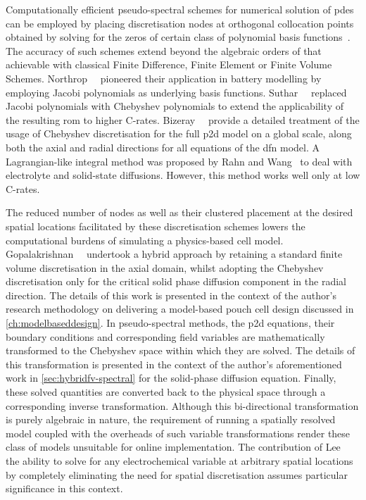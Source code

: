 Computationally    efficient     pseudo-spectral    schemes     for    numerical
solution   of   \glspl{pde}   can   be  employed   by   placing   discretisation
nodes    at    orthogonal    collocation     points    obtained    by    solving
for     the     zeros    of     certain     class     of    polynomial     basis
functions~\cite{Ferguson1971,Trefethen2000,Boyd2001,Shizgal2015,Dutykh2016}. The
accuracy of such  schemes extend beyond the algebraic orders  of that achievable
with  classical Finite  Difference,  Finite Element  or  Finite Volume  Schemes.
Northrop~\etal{}~\cite{Northrop2011}  pioneered  their  application  in  battery
modelling  by  employing  Jacobi  polynomials  as  underlying  basis  functions.
Suthar~\etal{}~\cite{Suthar2014}  replaced  Jacobi  polynomials  with  Chebyshev
polynomials to  extend the  applicability of the  resulting \gls{rom}  to higher
C-rates. Bizeray~\etal{}~\cite{Bizeray2015} provide a  detailed treatment of the
usage  of Chebyshev  discretisation for  the full  \gls{p2d} model  on a  global
scale, \ie{} along both the axial and radial directions for all equations of the
\gls{dfn}  model. A  Lagrangian-like integral  method was  proposed by  Rahn and
Wang~\cite{Rahn2013}  to  deal  with  electrolyte  and  solid-state  diffusions.
However, this method works well only at low C-rates.


The  reduced  number   of  nodes  as  well  as  their   clustered  placement  at
the  desired  spatial  locations  facilitated by  these  discretisation  schemes
lowers  the computational  burdens  of simulating  a  physics-based cell  model.
Gopalakrishnan~\etal{}~\cite{Gopalakrishnan2018} undertook a  hybrid approach by
retaining a  standard finite volume  discretisation in the axial  domain, whilst
adopting  the  Chebyshev  discretisation  only  for  the  critical  solid  phase
diffusion  component in  the  radial  direction. The  details  of  this work  is
presented in  the context of the  author's research methodology on  delivering a
model-based  pouch  cell  design  discussed  in  \cref{ch:modelbaseddesign}.  In
pseudo-spectral  methods, the  \gls{p2d}  equations,  their boundary  conditions
and  corresponding  field  variables   are  mathematically  transformed  to  the
Chebyshev   space  within   which  they   are  solved.   The  details   of  this
transformation  is  presented in  the  context  of the  author's  aforementioned
work  in \cref{sec:hybridfv-spectral}  for the  solid-phase diffusion  equation.
Finally,  these solved  quantities  are  converted back  to  the physical  space
through  a corresponding  inverse transformation.  Although this  bi-directional
transformation  is  purely  algebraic  in nature,  the  requirement  of  running
a  spatially  resolved  model  coupled  with  the  overheads  of  such  variable
transformations   render   these  class   of   models   unsuitable  for   online
implementation. The contribution  of Lee~\etal~\cite{Lee2012a,Lee2012} \ie{} the
ability to solve for any electrochemical variable at arbitrary spatial locations
by completely eliminating the need for spatial discretisation assumes particular
significance in this context.


